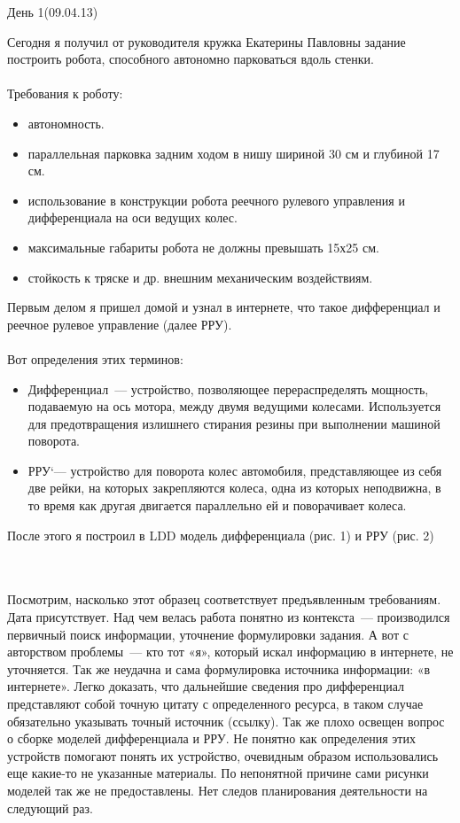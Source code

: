 {\slshape\begin{flushright}
		День 1(09.04.13)
	\end{flushright}
	
	\noindent Сегодня я получил от руководителя кружка Екатерины Павловны задание построить робота, способного автономно парковаться вдоль стенки.\\\\
	Требования к роботу:
	
	\begin{itemize}
		\item автономность.
		\item параллельная парковка задним ходом в нишу шириной 30 см и глубиной 17 см.
		\item использование в конструкции робота реечного рулевого управления и дифференциала на оси ведущих колес.
		\item максимальные габариты робота не должны превышать 15х25 см.
		\item стойкость к тряске и др. внешним механическим воздействиям.
	\end{itemize}
	
	\noindent Первым делом я пришел домой и узнал в интернете, что такое дифференциал и реечное рулевое управление (далее РРУ).\\\\
	Вот определения этих терминов:
	
	\begin{itemize}
		\item Дифференциал~--- устройство, позволяющее перераспределять мощность, подаваемую на ось мотора, между двумя ведущими колесами. Используется для предотвращения излишнего стирания резины при выполнении машиной поворота.
		\item РРУ`--- устройство для поворота колес автомобиля, представляющее из себя две рейки, на которых закрепляются колеса, одна из которых неподвижна, в то время как другая двигается параллельно ей и поворачивает колеса.
	\end{itemize}
	
	После этого я построил в LDD модель дифференциала (рис. 1) и РРУ (рис. 2)}\\\\

Посмотрим, насколько этот образец соответствует предъявленным требованиям. Дата присутствует. Над чем велась работа понятно из контекста~--- производился первичный поиск информации, уточнение формулировки задания. А вот с авторством проблемы~--- кто тот  «я», который искал информацию в интернете, не уточняется. Так же неудачна и сама формулировка  источника информации: «в интернете». Легко доказать, что дальнейшие сведения про дифференциал представляют собой точную цитату с определенного ресурса, в таком случае обязательно указывать точный источник (ссылку). 
Так же плохо освещен вопрос о сборке моделей дифференциала  и РРУ. Не понятно как определения этих устройств помогают понять их устройство, очевидным образом использовались еще какие-то не указанные материалы. По непонятной причине сами рисунки моделей так же  не предоставлены. Нет следов планирования деятельности на следующий раз.\\\\

